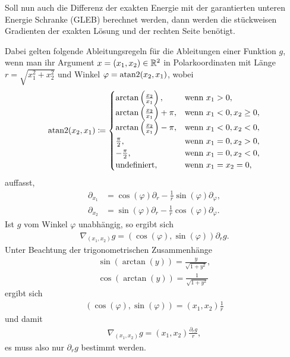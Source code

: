 Soll nun auch die Differenz der exakten Energie mit der garantierten unteren 
Energie Schranke (GLEB) berechnet werden, dann werden die stückweisen
Gradienten der exakten Lösung und der rechten Seite benötigt.

Dabei gelten folgende Ableitungsregeln für die Ableitungen einer Funktion 
$g$, wenn man ihr Argument $x=(x_1,x_2)\in\mathbb{R}^2$ in Polarkoordinaten mit Länge
$r=\sqrt{x_1^2+x_2^2}$ und Winkel
$\varphi = \operatorname{atan2}(x_2,x_1)$, wobei 
\begin{align*}
  \operatorname{atan2}(x_2,x_1)\coloneqq
  \begin{cases}
    \arctan\left( \frac{x_2}{x_1} \right),& \text{wenn }x_1>0,\\
    \arctan\left( \frac{x_2}{x_1} \right) +\pi,& \text{wenn }x_1<0,x_2\geq 0,\\
    \arctan\left( \frac{x_2}{x_1} \right) -\pi,& \text{wenn }x_1<0,x_2<0,\\
    \frac{\pi}{2},& \text{wenn }x_1=0,x_2>0,\\
    -\frac{\pi}{2},& \text{wenn }x_1=0,x_2<0,\\
    \text{undefiniert},& \text{wenn }x_1=x_2=0,\\
  \end{cases}
\end{align*}
auffasst,
\begin{align*}
  \partial_{x_1} &= 
  \cos(\varphi)\partial_r - \frac{1}{r}\sin(\varphi)\partial_\varphi,\\
  \partial_{x_2} &= 
  \sin(\varphi)\partial_r - \frac{1}{r}\cos(\varphi)\partial_\varphi.
\end{align*}
Ist $g$ vom Winkel $\varphi$ unabhängig, so ergibt sich
\begin{align*}
  \nabla_{(x_1,x_2)}g = (\cos(\varphi),\sin(\varphi))\partial_r g.
\end{align*}
Unter Beachtung der trigonometrischen Zusammenhänge
\begin{align*}
  \sin(\arctan(y)) = \frac{y}{\sqrt{1+y^2}},\\
  \cos(\arctan(y)) = \frac{1}{\sqrt{1+y^2}}
\end{align*}
ergibt sich 
\begin{align*}
  (\cos(\varphi),\sin(\varphi)) = (x_1,x_2)\frac{1}{r}
\end{align*}
und damit 
\begin{align*}
  \nabla_{(x_1,x_2)}g = (x_1,x_2)\frac{\partial_r g}{r},
\end{align*} 
es muss also nur $\partial_r g$ bestimmt werden.

